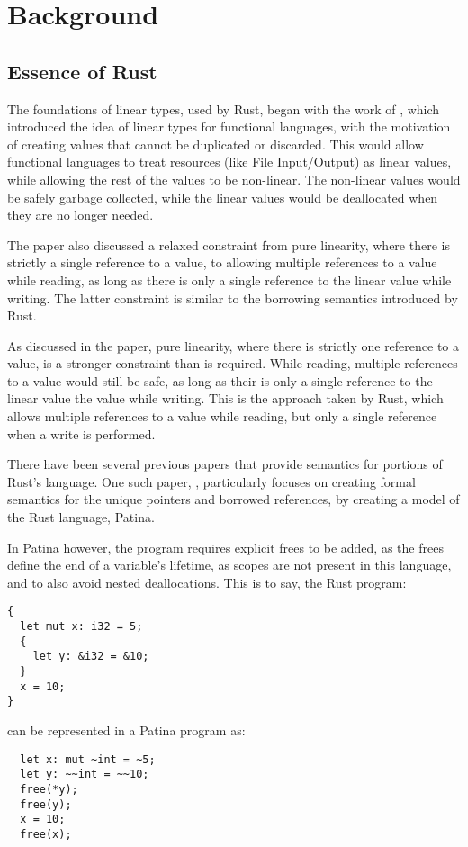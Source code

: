 \documentclass[review,twocolumn,preprint]{sigplanconf}
\begin{document}
\section{Background}


\subsection{Essence of Rust}

The foundations of linear types, used by Rust, began with the work of \citet{Wadler1990LinearTC}, which introduced the idea of linear types for functional languages, with the motivation of creating values that cannot be duplicated or discarded. This would allow functional languages to treat resources (like File Input/Output) as linear values, while allowing the rest of the values to be non-linear. The non-linear values would be safely garbage collected, while the linear values would be deallocated when they are no longer needed.

The paper also discussed a relaxed constraint from pure linearity, where there is strictly a single reference to a value, to allowing multiple references to a value while reading, as long as there is only a single reference to the linear value while writing. The latter constraint is similar to the borrowing semantics introduced by Rust.

As discussed in the paper, pure linearity, where there is strictly one reference to a value, is a stronger constraint than is required. While reading, multiple references to a value would still be safe, as long as their is only a single reference to the linear value the value while writing. This is the approach taken by Rust, which allows multiple references to a value while reading, but only a single reference when a write is performed.

There have been several previous papers that provide semantics for portions of Rust's language. One such paper, \citet{Reed2015PatinaA}, particularly focuses on creating formal semantics for the unique pointers and borrowed references, by creating a model of the Rust language, Patina.

In Patina however, the program requires explicit frees to be added, as the frees define the end of a variable's lifetime, as scopes are not present in this language, and to also avoid nested deallocations. This is to say, the Rust program:
\begin{verbatim}
{
  let mut x: i32 = 5;
  {
    let y: &i32 = &10;
  }
  x = 10;
}
\end{verbatim}
can be represented in a Patina program as:
\begin{verbatim}
  let x: mut ~int = ~5;
  let y: ~~int = ~~10;
  free(*y);
  free(y);
  x = 10;
  free(x);
\end{verbatim}
\end{document}
